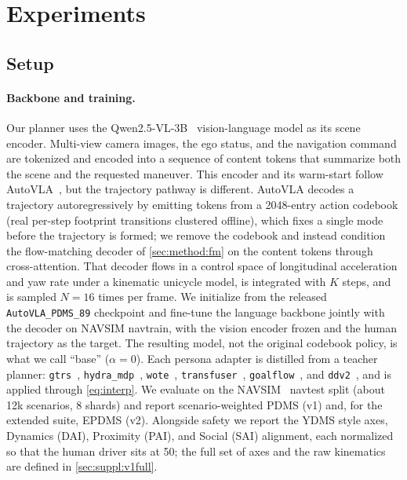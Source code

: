 \section{Experiments}
\label{sec:exp}

\subsection{Setup}
\label{sec:exp:setup}
\paragraph{Backbone and training.}
Our planner uses the Qwen2.5-VL-3B~\cite{qwenvl} vision-language model as its scene
encoder. Multi-view camera images, the ego status, and the navigation command are
tokenized and encoded into a sequence of content tokens that summarize both the scene
and the requested maneuver. This encoder and its warm-start follow
AutoVLA~\cite{autovla}, but the trajectory pathway is different. AutoVLA decodes a
trajectory autoregressively by emitting tokens from a 2048-entry action codebook (real
per-step footprint transitions clustered offline), which fixes a single mode before the
trajectory is formed; we remove the codebook and instead condition the flow-matching
decoder of \cref{sec:method:fm} on the content tokens through cross-attention. That
decoder flows in a control space of longitudinal acceleration and yaw rate under a
kinematic unicycle model, is integrated with $K$ steps, and is sampled $N{=}16$ times
per frame. We initialize from the released \texttt{AutoVLA\_PDMS\_89} checkpoint and
fine-tune the language backbone jointly with the decoder on NAVSIM navtrain, with the
vision encoder frozen and the human trajectory as the target. The resulting model, not
the original codebook policy, is what we call ``base'' ($\alpha{=}0$). Each persona
adapter is distilled from a teacher planner:
\texttt{gtrs}~\cite{gtrs}, \texttt{hydra\_mdp}~\cite{hydramdp}, \texttt{wote}~\cite{wote},
\texttt{transfuser}~\cite{transfuser}, \texttt{goalflow}~\cite{goalflow}, and
\texttt{ddv2}~\cite{diffusiondrive}, and is applied through \cref{eq:interp}. We
evaluate on the NAVSIM~\cite{navsim} navtest split (about 12k scenarios, 8 shards)
and report scenario-weighted PDMS (v1) and, for the extended suite, EPDMS (v2).
Alongside safety we report the YDMS style axes, Dynamics (DAI), Proximity (PAI), and
Social (SAI) alignment, each normalized so that the human driver sits at 50; the full
set of axes and the raw kinematics are defined in \cref{sec:suppl:v1full}.

